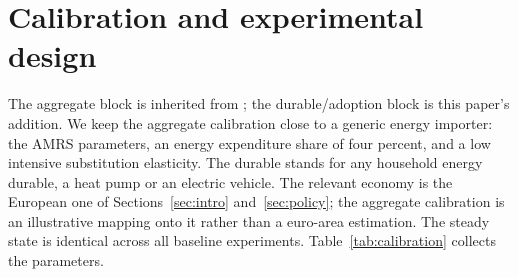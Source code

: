 %

\section{Calibration and experimental design}\label{sec:cal}

The aggregate block is inherited from \citet{auclert2023energy}; the durable/adoption block is
this paper's addition. We keep the aggregate calibration close to a generic energy
importer: the AMRS parameters, an energy expenditure share of four percent, and a
low intensive substitution elasticity. The durable stands for any household energy
durable, a heat pump or an electric vehicle. The relevant economy is the European one of Sections~\ref{sec:intro}
and~\ref{sec:policy}; the aggregate calibration is an illustrative mapping onto it
rather than a euro-area estimation. The steady state is
identical across all baseline experiments. Table~\ref{tab:calibration} collects the
parameters.


